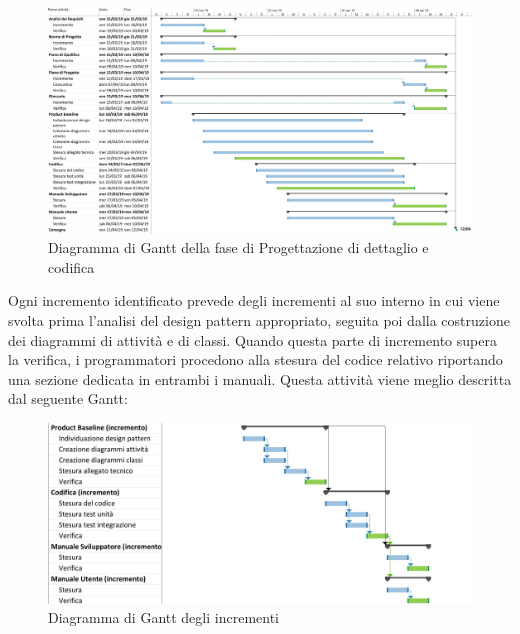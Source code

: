 \begin{figure}[H]
	\includegraphics[width=0.99\linewidth]{res/images/gantt_pd.jpg}
	\caption{Diagramma di Gantt della fase di Progettazione di dettaglio e codifica}
\end{figure}

Ogni incremento identificato prevede degli incrementi al suo interno in cui 
viene svolta prima l'analisi del design pattern appropriato, seguita poi dalla
costruzione dei diagrammi di attività e di classi. Quando questa parte di incremento supera la verifica,
i programmatori procedono alla stesura del codice relativo riportando una sezione 
dedicata in entrambi i manuali. Questa attività viene meglio descritta dal seguente
Gantt:

\begin{figure}[H]
	\includegraphics[width=0.99\linewidth]{res/images/incremento.jpg}
	\caption{Diagramma di Gantt degli incrementi}
\end{figure}

